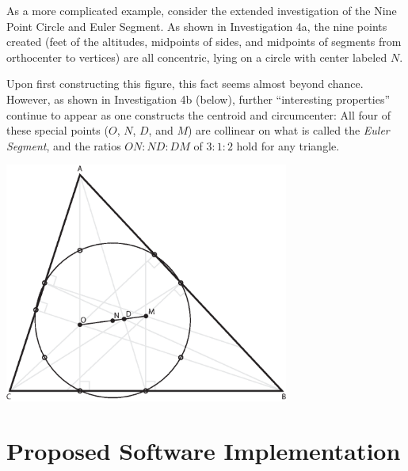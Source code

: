 \documentclass[10pt]{article}
\begin{document}

\onehalfspacing

As a more complicated example, consider the extended investigation of
the Nine Point Circle and Euler Segment.  As shown in Investigation
4a, the nine points created (feet of the altitudes, midpoints of
sides, and midpoints of segments from orthocenter to vertices) are all
concentric, lying on a circle with center labeled $N$.

Upon first constructing this figure, this fact seems almost beyond
chance.  However, as shown in Investigation 4b (below), further
``interesting properties'' continue to appear as one constructs the
centroid and circumcenter: All four of these special points ($O$, $N$,
$D$, and $M$) are collinear on what is called the \emph{Euler
  Segment}, and the ratios $ON:ND:DM$ of $3:1:2$ hold for any
triangle.

\singlespacing

\begin{center}
\includegraphics[width=0.7\textwidth]{diagrams/euler-line.eps}
\end{center}


\onehalfspacing
\section{Proposed Software Implementation}
\end{document}
